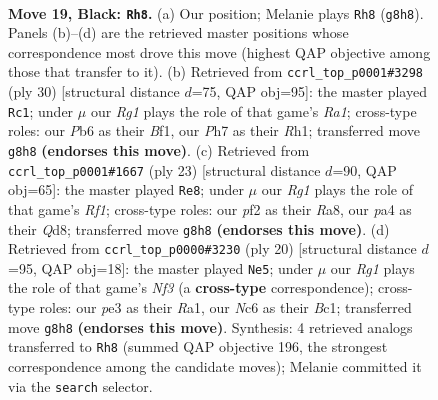 \documentclass[11pt]{article}
\begin{document}
\clearpage

\begin{figure}[p]\centering
\begin{subfigure}{0.46\textwidth}\centering
\resizebox{\linewidth}{!}{%
\newchessgame
\chessboard[
  setfen={r1b1k1r1/p3b1pp/1pnq4/3p1p1n/Pp1P3P/4PNPB/R3QP2/1NB1R1K1 b - - 2 19},
  showmover=false,
  pgfstyle=straightmove, color=movearrow, markmove={g8-h8}
]}
\caption{}
\end{subfigure}\hfill
\begin{subfigure}{0.46\textwidth}\centering
\resizebox{\linewidth}{!}{%
\newchessgame
\chessboard[
  setfen={r1br2k1/p3qpb1/1pn2np1/2p4p/2P1PN1P/2N1BP2/PP3Q2/R3KB1R w KQ - 0 16},
  showmover=false,
  pgfstyle=straightmove, color=movearrow, markmove={a1-c1}
]}
\caption{}
\end{subfigure}
\\[4pt]
\begin{subfigure}{0.46\textwidth}\centering
\resizebox{\linewidth}{!}{%
\newchessgame
\chessboard[
  setfen={r1bq1rk1/bpp1npp1/p2p1n1p/3P4/2P5/1PN2NPP/P4PB1/R1BQ1RK1 b - - 0 12},
  showmover=false,
  pgfstyle=straightmove, color=movearrow, markmove={f8-e8}
]}
\caption{}
\end{subfigure}\hfill
\begin{subfigure}{0.46\textwidth}\centering
\resizebox{\linewidth}{!}{%
\newchessgame
\chessboard[
  setfen={rn2kb1r/pb3ppp/4pn2/q1p5/Np1PP3/1P1Q1N2/P4PPP/R1B1KB1R w KQkq - 0 11},
  showmover=false,
  pgfstyle=straightmove, color=movearrow, markmove={f3-e5}
]}
\caption{}
\end{subfigure}
\caption{\textbf{Move 19, Black: \texttt{Rh8}.} (a) Our position; Melanie plays \texttt{Rh8} (\texttt{g8h8}). Panels (b)--(d) are the retrieved master positions whose correspondence most drove this move (highest QAP objective among those that transfer to it). (b) Retrieved from \texttt{ccrl\_top\_p0001\#3298} (ply 30) [structural distance $d$=75, QAP obj=95]: the master played \texttt{Rc1}; under $\mu$ our \emph{Rg1} plays the role of that game's \emph{Ra1}; cross-type roles: our \emph{P}b6 as their \emph{B}f1, our \emph{P}h7 as their \emph{R}h1; transferred move \texttt{g8h8} \textbf{(endorses this move)}. (c) Retrieved from \texttt{ccrl\_top\_p0001\#1667} (ply 23) [structural distance $d$=90, QAP obj=65]: the master played \texttt{Re8}; under $\mu$ our \emph{Rg1} plays the role of that game's \emph{Rf1}; cross-type roles: our \emph{p}f2 as their \emph{R}a8, our \emph{p}a4 as their \emph{Q}d8; transferred move \texttt{g8h8} \textbf{(endorses this move)}. (d) Retrieved from \texttt{ccrl\_top\_p0000\#3230} (ply 20) [structural distance $d$=95, QAP obj=18]: the master played \texttt{Ne5}; under $\mu$ our \emph{Rg1} plays the role of that game's \emph{Nf3} (a \textbf{cross-type} correspondence); cross-type roles: our \emph{p}e3 as their \emph{R}a1, our \emph{N}c6 as their \emph{B}c1; transferred move \texttt{g8h8} \textbf{(endorses this move)}. Synthesis: 4 retrieved analogs transferred to \texttt{Rh8} (summed QAP objective 196, the strongest correspondence among the candidate moves); Melanie committed it via the \texttt{search} selector.}
\label{fig:thought-m37}
\end{figure}
\end{document}
